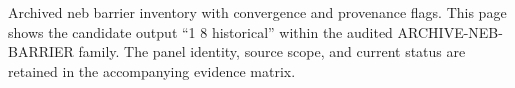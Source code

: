 Archived neb barrier inventory with convergence and provenance flags. This page shows the candidate output ``1 8 historical'' within the audited ARCHIVE-NEB-BARRIER family. The panel identity, source scope, and current status are retained in the accompanying evidence matrix.
